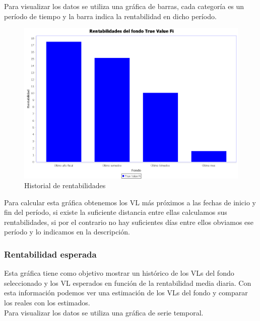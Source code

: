 \documentclass[12pt, a4paper]{article}
\begin{document}
Para visualizar los datos se utiliza una gráfica de barras, cada categoría es un período de tiempo y la barra indica la rentabilidad en dicho período.

	\begin{figure}[htbp]
	\centering
	\includegraphics[width=\textwidth]{figuras/rentabilidades.PNG}
	\caption{Historial de rentabilidades}
	\label{fig:rentabilidades}
	\end {figure}

Para calcular esta gráfica obtenemos los \gls{VL} más próximos a las fechas de inicio y fin del período, si existe la suficiente distancia entre ellas calculamos sus rentabilidades, si por el contrario no hay suficientes días entre ellos obviamos ese período y lo indicamos en la descripción.

\newpage

\subsubsection{Rentabilidad esperada}

Esta gráfica tiene como objetivo mostrar un histórico de los \gls{VL}s del fondo seleccionado y los \gls{VL} esperados en función de la rentabilidad media diaria. Con esta información podemos ver una estimación de los \gls{VL}s del fondo y comparar los reales con los estimados.\\

Para visualizar los datos se utiliza una gráfica de serie temporal.
\end{document}
